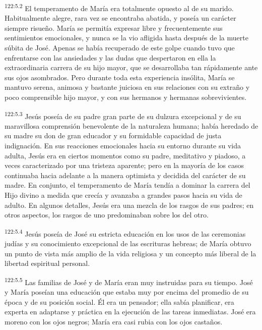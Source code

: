 \par
\textsuperscript{122:5.2} El temperamento de María era totalmente opuesto al de su marido. Habitualmente alegre, rara vez se encontraba abatida, y poseía un carácter siempre risueño. María se permitía expresar libre y frecuentemente sus sentimientos emocionales, y nunca se la vio afligida hasta después de la muerte súbita de José. Apenas se había recuperado de este golpe cuando tuvo que enfrentarse con las ansiedades y las dudas que despertaron en ella la extraordinaria carrera de su hijo mayor, que se desarrollaba tan rápidamente ante sus ojos asombrados. Pero durante toda esta experiencia insólita, María se mantuvo serena, animosa y bastante juiciosa en sus relaciones con su extraño y poco comprensible hijo mayor, y con sus hermanos y hermanas sobrevivientes.

\par
\textsuperscript{122:5.3} Jesús poseía de su padre gran parte de su dulzura excepcional y de su maravillosa comprensión benevolente de la naturaleza humana; había heredado de su madre su don de gran educador y su formidable capacidad de justa indignación. En sus reacciones emocionales hacia su entorno durante su vida adulta, Jesús era en ciertos momentos como su padre, meditativo y piadoso, a veces caracterizado por una tristeza aparente; pero en la mayoría de los casos continuaba hacia adelante a la manera optimista y decidida del carácter de su madre. En conjunto, el temperamento de María tendía a dominar la carrera del Hijo divino a medida que crecía y avanzaba a grandes pasos hacia su vida de adulto. En algunos detalles, Jesús era una mezcla de los rasgos de sus padres; en otros aspectos, los rasgos de uno predominaban sobre los del otro.

\par
\textsuperscript{122:5.4} Jesús poseía de José su estricta educación en los usos de las ceremonias judías y su conocimiento excepcional de las escrituras hebreas; de María obtuvo un punto de vista más amplio de la vida religiosa y un concepto más liberal de la libertad espiritual personal.

\par
\textsuperscript{122:5.5} Las familias de José y de María eran muy instruidas para su tiempo. José y María poseían una educación que estaba muy por encima del promedio de su época y de su posición social. Él era un pensador; ella sabía planificar, era experta en adaptarse y práctica en la ejecución de las tareas inmediatas. José era moreno con los ojos negros; María era casi rubia con los ojos castaños.

